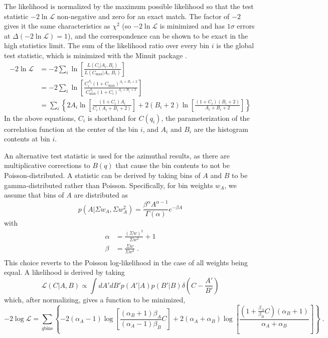 The likelihood is normalized by the maximum possible likelihood so that the test statistic $-2\ln \mathcal{L}$ non-negative and zero for an exact match.
The factor of $-2$ gives it the same characteristics as $\chi^2$ (so $-2\ln\mathcal{L}$ is minimized and has $1\sigma$ errors at $\Delta (-2\ln\mathcal{L}) = 1$), and the correspondence can be shown to be exact in the high statistics limit.
The sum of the likelihood ratio over every bin $i$ is the global test statistic, which is minimized with the Minuit package \cite{James:1975dr}.
\begin{align}
-2\ln \mathcal{L} &= -2 \sum_i \ln \left[ \frac{L(C_i|A_i,B_i)}{L(C_{\textrm{max}}|A_i,B_i)} \right]\\
&= -2 \sum_i \ln \left[ \frac{C_i^{A_i} (1+C_{\textrm{max}})^{A_i+B_i+2}}{C_{\textrm{max}}^{A_i} (1+C_i)^{A_i+B_i+2}} \right]\\
&= \sum_i \left\{ 2 A_i \ln \left[\frac{(1+C_i)A_i}{C_i (A_i+B_i+2)} \right] + 2(B_i+2) \ln \left[ \frac{(1+C_i)(B_i+2)}{A_i+B_i+2} \right] \right\}
\end{align}
In the above equations, $C_i$ is shorthand for $C(q_i)$, the parameterization of the correlation function at the center of the bin $i$, and $A_i$ and $B_i$ are the histogram contents at bin $i$.

An alternative test statistic is used for the azimuthal results, as there are multiplicative corrections to $B(q)$ that cause the bin contents to not be Poisson-distributed.
A statistic can be derived by taking bins of $A$ and $B$ to be gamma-distributed rather than Poisson.
Specifically, for bin weights $w_A$, we assume that bins of $A$ are distributed as
\begin{equation}
  p\left(A|\Sigma w_A, \Sigma w_A^2 \right) = \frac{\beta^\alpha A^{\alpha-1}}{\Gamma (\alpha)}e^{-\beta A}
\end{equation}
with
\begin{align*}
  \alpha &= \frac{(\Sigma w)^2}{\Sigma w^2} + 1\\
  \beta &= \frac{\Sigma w}{\Sigma w^2} \; .\\
\end{align*}
This choice reverts to the Poisson log-likelihood in the case of all weights being equal.
A likelihood is derived by taking
\begin{equation}
  \mathcal{L}\left( C | A,B \right) \propto \int dA' dB' p\left(A'|A\right) p\left(B'|B\right) \delta\left(C - \frac{A'}{B'}\right)
\end{equation}
which, after normalizing, gives a function to be minimized,
\begin{equation}
  -2\log\mathcal{L} = \sum_{q \textrm{bins}} \left\{-2(\alpha_A - 1) \log \left[ \frac{(\alpha_B +1)\beta_A}{(\alpha_A - 1)\beta_B} C \right] + 2(\alpha_A + \alpha_B) \log \left[ \frac{\left( 1 + \frac{\beta_A}{\beta_B} C\right)(\alpha_B + 1)}{\alpha_A + \alpha_B} \right] \right\} \; .
\end{equation}

